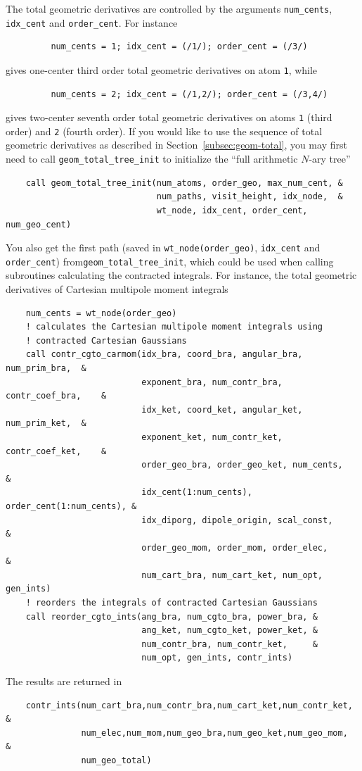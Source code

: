 \documentclass[a4paper,11pt,twoside,openright]{book}
\begin{document}
The total geometric derivatives are controlled by the arguments \verb|num_cents|,
\verb|idx_cent| and \verb|order_cent|. For instance
\begin{verbatim}
         num_cents = 1; idx_cent = (/1/); order_cent = (/3/)
\end{verbatim}
gives one-center third order total geometric derivatives on atom \verb|1|, while
\begin{verbatim}
         num_cents = 2; idx_cent = (/1,2/); order_cent = (/3,4/)
\end{verbatim}
gives two-center seventh order total geometric derivatives on atoms \verb|1| (third order)
and \verb|2| (fourth order). If you would like to use the sequence of total geometric derivatives
as described in Section~\ref{subsec:geom-total}, you may first need to call \verb|geom_total_tree_init|
to initialize the ``full arithmetic $N$-ary tree''
\begin{verbatim}
    call geom_total_tree_init(num_atoms, order_geo, max_num_cent, &
                              num_paths, visit_height, idx_node,  &
                              wt_node, idx_cent, order_cent, num_geo_cent)
\end{verbatim}
You also get the first path (saved in \verb|wt_node(order_geo)|, \verb|idx_cent| and
\verb|order_cent|) from\linebreak \verb|geom_total_tree_init|, which could be used when calling
subroutines calculating the contracted integrals. For instance, the total geometric
derivatives of Cartesian multipole moment integrals
\begin{verbatim}
    num_cents = wt_node(order_geo)
    ! calculates the Cartesian multipole moment integrals using
    ! contracted Cartesian Gaussians
    call contr_cgto_carmom(idx_bra, coord_bra, angular_bra, num_prim_bra,  &
                           exponent_bra, num_contr_bra, contr_coef_bra,    &
                           idx_ket, coord_ket, angular_ket, num_prim_ket,  &
                           exponent_ket, num_contr_ket, contr_coef_ket,    &
                           order_geo_bra, order_geo_ket, num_cents,        &
                           idx_cent(1:num_cents), order_cent(1:num_cents), &
                           idx_diporg, dipole_origin, scal_const,          &
                           order_geo_mom, order_mom, order_elec,           &
                           num_cart_bra, num_cart_ket, num_opt, gen_ints)
    ! reorders the integrals of contracted Cartesian Gaussians
    call reorder_cgto_ints(ang_bra, num_cgto_bra, power_bra, &
                           ang_ket, num_cgto_ket, power_ket, &
                           num_contr_bra, num_contr_ket,     &
                           num_opt, gen_ints, contr_ints)
\end{verbatim}
The results are returned in
\begin{verbatim}
    contr_ints(num_cart_bra,num_contr_bra,num_cart_ket,num_contr_ket, &
               num_elec,num_mom,num_geo_bra,num_geo_ket,num_geo_mom,  &
               num_geo_total)
\end{verbatim}
\end{document}
